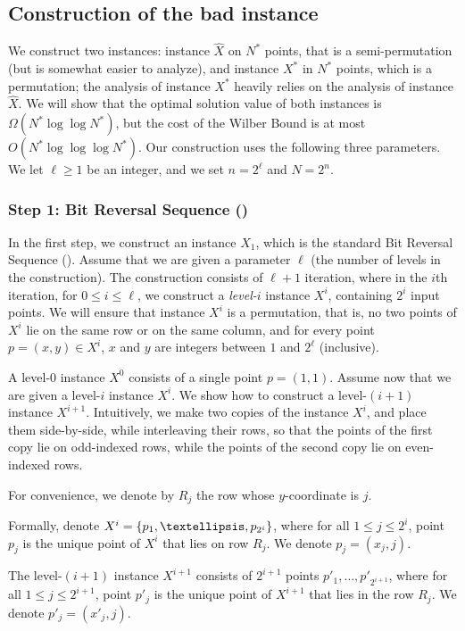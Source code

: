 \documentclass[11pt]{article}
\numberwithin{equation}{section}
\theoremstyle{definition}
\theoremstyle{plain}
\begin{document}
\subsection{Construction of the bad instance} 

\label{sec:construction}
We construct two instances: instance $\hat X$ on $N^*$ points, that is a semi-permutation (but is somewhat easier to analyze), and instance $X^*$ in $N^*$ points, which is a permutation; the analysis of instance $X^*$ heavily relies on the analysis of instance $\hat X$. 
We will show that the optimal solution value of both instances is $\Omega(N^*\log\log N^*)$, but the cost of the Wilber Bound is at most $O(N^*\log\log\log N^*)$.
Our construction uses the following three parameters. We let $\ell\geq 1$ be an integer, and we set $n=2^{\ell}$ and $N = 2^n$. 


\iffalse 


\subsubsection{Step 1: Bit Reversal Sequence (\BRS)}
In the first step, we construct an instance $X_1$, which is the standard Bit Reversal Sequence (\BRS). Assume that we are given a parameter $\ell$ (the number of levels in the construction). The construction consists of $\ell+1$ iteration, where in the $i$th iteration, for $0 \leq i\leq \ell$, we construct a \emph{level-$i$} instance $X^i$, containing $2^i$ input points. We will ensure that instance $X^i$ is a permutation, that is, no two points of $X^i$ lie on the same row or on the same column, and for every point $p=(x,y)\in X^i$, $x$ and $y$ are integers between $1$ and $2^{\ell}$ (inclusive).%

A level-$0$ instance $X^0$ consists of a single point $p=(1,1)$.
Assume now that we are given a level-$i$ instance $X^i$. We show how to construct a level-$(i+1)$ instance $X^{i+1}$.
Intuitively, we make two copies of the instance $X^i$, and place them side-by-side, while interleaving their rows, so that the points of the first copy lie on odd-indexed rows, while the points of the second copy lie on even-indexed rows.

For convenience, we denote by $R_j$ the row whose $y$-coordinate is $j$.

Formally, denote $X^i=\set{p_1,\ldots,p_{2^i}}$, where for all $1\leq j\leq 2^i$, point $p_j$ is the unique point of $X^i$ that lies on row $R_j$. We denote $p_j=(x_j,j)$.

The level-$(i+1)$ instance $X^{i+1}$ consists of $2^{i+1}$ points $p'_1,\ldots,p'_{2^{i+1}}$, where for all $1\leq j\leq 2^{i+1}$, point $p'_j$ is the unique point of $X^{i+1}$ that lies in the row $R_j$. We denote $p'_j=(x'_j,j)$.
\end{document}
